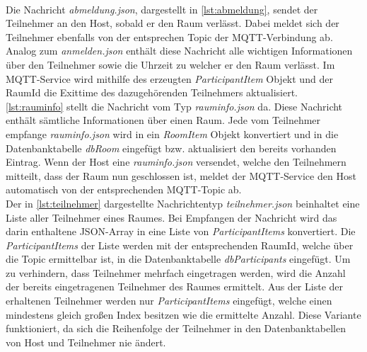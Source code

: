 \\
Die Nachricht \textit{abmeldung.json}, dargestellt in \cref{lst:abmeldung},   sendet der Teilnehmer an den Host, sobald er den Raum verlässt. 
Dabei meldet sich der Teilnehmer ebenfalls von der entsprechen Topic der MQTT-Verbindung ab. 
Analog zum \textit{anmelden.json} enthält diese Nachricht alle wichtigen Informationen über den Teilnehmer sowie die Uhrzeit zu welcher er den Raum verlässt. 
Im MQTT-Service wird mithilfe des erzeugten \textit{ParticipantItem} Objekt und der RaumId die Exittime des dazugehörenden Teilnehmers aktualisiert.  
\\
\cref{lst:rauminfo} stellt die Nachricht vom Typ \textit{rauminfo.json} da. 
Diese Nachricht enthält sämtliche Informationen über einen Raum. 
Jede vom Teilnehmer empfange \textit{rauminfo.json} wird in ein \textit{RoomItem} Objekt konvertiert und in die Datenbanktabelle \textit{dbRoom} eingefügt bzw. aktualisiert den bereits vorhanden Eintrag. 
Wenn der Host eine \textit{rauminfo.json} versendet, welche den Teilnehmern mitteilt, dass der Raum nun geschlossen ist, meldet der MQTT-Service den Host automatisch von der entsprechenden MQTT-Topic ab.
\\
Der in \cref{lst:teilnehmer} dargestellte Nachrichtentyp \textit{teilnehmer.json} beinhaltet eine Liste aller Teilnehmer eines Raumes. 
Bei Empfangen der Nachricht wird das darin enthaltene JSON-Array in eine Liste von \textit{ParticipantItems} konvertiert. 
Die \textit{ParticipantItems} der Liste werden mit der entsprechenden RaumId, welche über die Topic ermittelbar ist, in die Datenbanktabelle \textit{dbParticipants} eingefügt. 
Um zu verhindern, dass Teilnehmer mehrfach eingetragen werden, wird die Anzahl der bereits eingetragenen Teilnehmer des Raumes ermittelt. 
Aus der Liste der erhaltenen Teilnehmer werden nur \textit{ParticipantItems} eingefügt, welche einen mindestens gleich großen Index besitzen wie die ermittelte Anzahl. 
Diese Variante funktioniert, da sich die Reihenfolge der Teilnehmer in den Datenbanktabellen von Host und Teilnehmer nie ändert.

